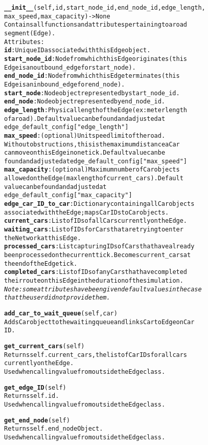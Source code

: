 \begin{alltt}
\textbf{__init__}(self, id, start_node_id, end_node_id, edge_length,
max_speed, max_capacity) -> None
Contains all functions and attributes pertaining to a road 
segment (Edge).
Attributes:
    \textbf{id}:  Unique ID associated with this Edge object.
    \textbf{start_node_id}:  Node from which this Edge originates (this
    Edge is an outbound_edge for start_node).
    \textbf{end_node_id}:  Node from which this Edge terminates (this 
    Edge is an inbound_edge for end_node).
    \textbf{start_node}:  Node object represented by start_node_id.
    \textbf{end_node}:  Node object represented by end_node_id.
    \textbf{edge_length}:  Physical length of the Edge (ex: meter length
    of a road).  Default value can be found and adjusted at
    edge_default_config["edge_length"]
    \textbf{max_speed}:  (optional) Unit speed limit of the road.  
    Without obstructions, this is the maximum distance a Car 
    can move on this Edge in one tick.  Default value can be 
    found and adjusted at edge_default_config["max_speed"]
    \textbf{max_capacity}:  (optional) Maximum number of Car objects
    allowed on the Edge (max length of current_cars). Default 
    value can be found and adjusted at 
    edge_default_config["max_capacity"]
    \textbf{edge_car_ID_to_car}:  Dictionary containing all Car objects
    associated with the Edge; maps Car IDs to Car objects.
    \textbf{current_cars}:  List of IDs of all Cars currently on the Edge.
    \textbf{waiting_cars}:  List of IDs for Cars that are trying to enter
    the Network at this Edge.
    \textbf{processed_cars}:  List capturing IDs of Cars that have already
    been processed on the current tick.  Becomes current_cars at 
    the end of the Edge tick.
    \textbf{completed_cars}:  List of IDs of any Cars that have completed
    their route on this Edge in the duration of the simulation.
\textit{Note:  some attributes have been given default values in the case
that the user did not provide them.}

\textbf{add_car_to_wait_queue}(self, car)
Adds Car object to the waiting queue and links Car to Edge on Car 
ID.

\textbf{get_current_cars}(self)
Returns self.current_cars, the list of Car IDs for all cars 
currently on the Edge.
Used when calling value from outside the Edge class.

\textbf{get_edge_ID}(self)
Returns self.id.
Used when calling value from outside the Edge class.

\textbf{get_end_node}(self)
Returns self.end_node Object.
Used when calling value from outside the Edge class.


\end{alltt}
